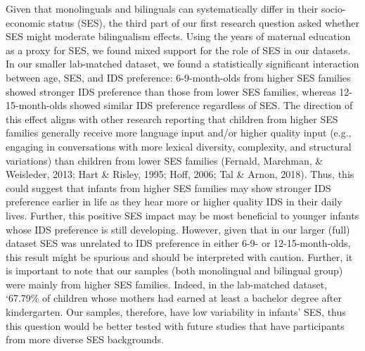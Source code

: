 \documentclass[
  english,
  ,man,floatsintext]{apa6}
\begin{document}
Given that monolinguals and bilinguals can systematically differ in their socio-economic status (SES), the third part of our first research question asked whether SES might moderate bilingualism effects. Using the years of maternal education as a proxy for SES, we found mixed support for the role of SES in our datasets. In our smaller lab-matched dataset, we found a statistically significant interaction between age, SES, and IDS preference: 6-9-month-olds from higher SES families showed stronger IDS preference than those from lower SES families, whereas 12-15-month-olds showed similar IDS preference regardless of SES. The direction of this effect aligns with other research reporting that children from higher SES families generally receive more language input and/or higher quality input (e.g., engaging in conversations with more lexical diversity, complexity, and structural variations) than children from lower SES families (Fernald, Marchman, \& Weisleder, 2013; Hart \& Risley, 1995; Hoff, 2006; Tal \& Arnon, 2018). Thus, this could suggest that infants from higher SES families may show stronger IDS preference earlier in life as they hear more or higher quality IDS in their daily lives. Further, this positive SES impact may be most beneficial to younger infants whose IDS preference is still developing. However, given that in our larger (full) dataset SES was unrelated to IDS preference in either 6-9- or 12-15-month-olds, this result might be spurious and should be interpreted with caution. Further, it is important to note that our samples (both monolingual and bilingual group) were mainly from higher SES families. Indeed, in the lab-matched dataset, `67.79\% of children whose mothers had earned at least a bachelor degree after kindergarten. Our samples, therefore, have low variability in infants' SES, thus this question would be better tested with future studies that have participants from more diverse SES backgrounds.
\end{document}
